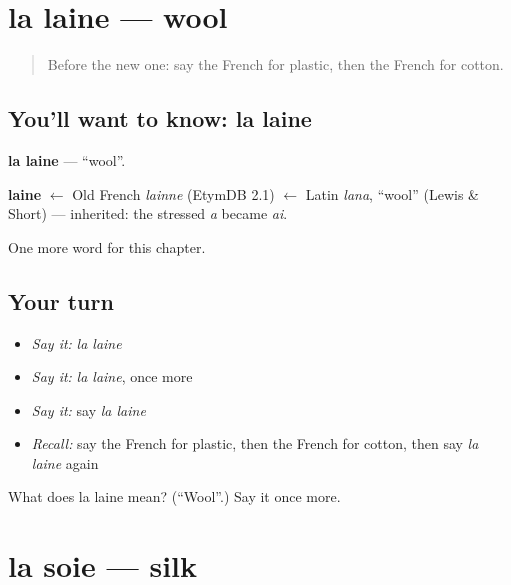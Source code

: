 \section[la laine]{la laine — wool}

\label{lesson:FR-C172-laine}



\begin{quote}
Before the new one: say the French for plastic, then the French for cotton.
\end{quote}

\subsection*{You'll want to know: la laine}
\textbf{la laine} — \textquotedblleft{}wool\textquotedblright{}.

\begin{cousinweb}
\textbf{laine} $\leftarrow$ Old French \emph{lainne} (EtymDB 2.1) $\leftarrow$ Latin \emph{lana}, \textquotedblleft{}wool\textquotedblright{} (Lewis \& Short) — inherited: the stressed \emph{a} became \emph{ai}.
\end{cousinweb}

\begin{grammarlens}[title={What you've built}]
One more word for this chapter.
\end{grammarlens}

\subsection*{Your turn}
\begin{itemize}
\raggedright
  \item \emph{Say it:} \emph{la laine}
  \item \emph{Say it:} \emph{la laine}, once more
  \item \emph{Say it:} say \emph{la laine}
  \item \emph{Recall:} say the French for plastic, then the French for cotton, then say \emph{la laine} again
\end{itemize}

\begin{tcolorbox}[breakable,colback=teal!4,colframe=teal!35!black,title={Before you move on}]
What does la laine mean? (\textquotedblleft{}Wool\textquotedblright{}.) Say it once more.
\end{tcolorbox}
\section[la soie]{la soie — silk}

